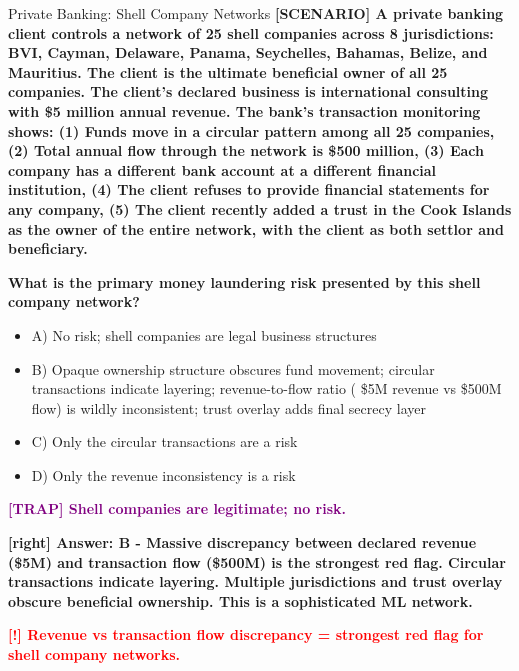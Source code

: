 \documentclass[11pt,a4paper]{beamer}
\newcommand{\redflag}[1]{\textcolor{red}{\textbf{[!] #1}}}
\newcommand{\trap}[1]{\textcolor{purple}{\textbf{[TRAP] #1}}}
\newcommand{\correct}[1]{\textcolor{green!50!black}{\textbf{[right] #1}}}
\newcommand{\scenario}[1]{\textcolor{blue!70!black}{\textbf{[SCENARIO] #1}}}
\begin{document}
	
	\begin{frame}{Private Banking: Shell Company Networks}
		\tiny
		\scenario{A private banking client controls a network of 25 shell companies across 8 jurisdictions: BVI, Cayman, Delaware, Panama, Seychelles, Bahamas, Belize, and Mauritius. The client is the ultimate beneficial owner of all 25 companies. The client's declared business is international consulting with \$5 million annual revenue. The bank's transaction monitoring shows: (1) Funds move in a circular pattern among all 25 companies, (2) Total annual flow through the network is \$500 million, (3) Each company has a different bank account at a different financial institution, (4) The client refuses to provide financial statements for any company, (5) The client recently added a trust in the Cook Islands as the owner of the entire network, with the client as both settlor and beneficiary.}
		
		\vspace{0.02cm}
		\textbf{What is the primary money laundering risk presented by this shell company network?}
		\vspace{0.02cm}
		
		\begin{itemize}
			\item A) No risk; shell companies are legal business structures
			\item B) Opaque ownership structure obscures fund movement; circular transactions indicate layering; revenue-to-flow ratio ( \$5M revenue vs \$500M flow) is wildly inconsistent; trust overlay adds final secrecy layer
			\item C) Only the circular transactions are a risk
			\item D) Only the revenue inconsistency is a risk
		\end{itemize}
		
		\vspace{0.02cm}
		\trap{Shell companies are legitimate; no risk.}
		
		\vspace{0.02cm}
		\correct{Answer: B - Massive discrepancy between declared revenue (\$5M) and transaction flow (\$500M) is the strongest red flag. Circular transactions indicate layering. Multiple jurisdictions and trust overlay obscure beneficial ownership. This is a sophisticated ML network.}
		
		\vspace{0.02cm}
		\redflag{Revenue vs transaction flow discrepancy = strongest red flag for shell company networks.}
	\end{frame}
	
\end{document}
